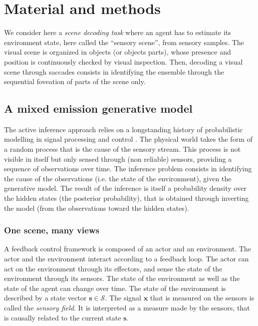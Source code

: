 \documentclass[12pt,twoside,openright]{article}
\begin{document}
\section{Material and methods} \label{sec:material}

We consider here a \emph{scene decoding task} where an agent has to estimate its environment state, here called the ``sensory scene'', from sensory samples. The visual scene is organized in objects (or objects parts), whose presence and position is continuously checked by visual inspection. 
Then, decoding a visual scene through saccades consists in identifying the ensemble through the sequential foveation of parts of the scene only. 

\subsection{A mixed emission generative model}\label{sec:three-party}


{\color{Purple} The active inference approach relies on a longstanding history of probabilistic modelling in signal processing and control \citep{Kalman1960,Baum1966}. The physical world takes the form of a random  process that is the cause of the sensory stream. This process is not visible in itself but only sensed through (non reliable) sensors, providing a sequence of observations over time. The inference problem consists in identifying the cause of the observations (i.e. the state of the environment), given the generative model. The result of the inference is itself a probability density over the hidden states (the posterior probability), that is obtained through  inverting the model (from the observations toward the hidden states).}

\subsubsection{One scene, many views}

A feedback control framework is composed of an actor and an environment. The actor and the environment interact according to a feedback loop. 
The actor can act on the environment through its effectors, and sense the state of the environment through its sensors. 
The state of the environment as well as the state of the agent can change over time. The state of the environment is described by a state vector $\boldsymbol{s} \in \mathcal{S}$.
The signal $\boldsymbol{x}$ that is measured on the sensors is called the \emph{sensory field}. It is interpreted as a measure made by the sensors, that is causally related to the current state $\boldsymbol{s}$. 
\end{document}
